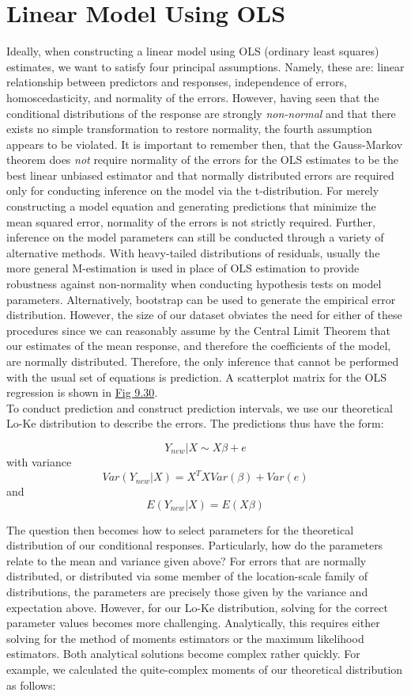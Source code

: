 \documentclass[12pt, a4paper, openany]{book}
\newcommand\tab[1][1cm]{\hspace*{#1}}
\begin{document}
	\section{Linear Model Using OLS}
	\tab Ideally, when constructing a linear model using OLS (ordinary least squares) estimates, we want to satisfy four principal assumptions. Namely, these are: linear relationship between predictors and responses, independence of errors, homoscedasticity, and normality of the errors. However, having seen that the conditional distributions of the response are strongly \textit{non-normal} and that there exists no simple transformation to restore normality, the fourth assumption appears to be violated. It is important to remember then, that the Gauss-Markov theorem does \textit{not} require normality of the errors for the OLS estimates to be the best linear unbiased estimator and that normally distributed errors are required only for conducting inference on the model via the t-distribution. For merely constructing a model equation and generating predictions that minimize the mean squared error, normality of the errors is not strictly required. Further, inference on the model parameters can still be conducted through a variety of alternative methods. With heavy-tailed distributions of residuals, usually the more general M-estimation is used in place of OLS estimation to provide robustness against non-normality when conducting hypothesis tests on model parameters. Alternatively, bootstrap can be used to generate the empirical error distribution. However, the size of our dataset obviates the need for either of these procedures since we can reasonably assume by the Central Limit Theorem that our estimates of the mean response, and therefore the coefficients of the model, are normally distributed. Therefore, the only inference that cannot be performed with the usual set of equations is prediction. A scatterplot matrix for the OLS regression is shown in \underline{Fig 9.30}.\\
	\tab To conduct prediction and construct prediction intervals, we use our theoretical Lo-Ke distribution to describe the errors. The predictions thus have the form: \begin{center}
	$$Y_{new}|X\sim X\beta + e$$
	with variance
	$$Var(Y_{new}|X) = X^TXVar(\beta) + Var(e)$$
	and
	$$E(Y_{new}|X) = E(X\beta)$$
	\end{center} 
	\tab The question then becomes how to select parameters for the theoretical distribution of our conditional responses. Particularly, how do the parameters relate to the mean and variance given above?  For errors that are normally distributed, or distributed via some member of the location-scale family of distributions, the parameters are precisely those given by the variance and expectation above. However, for our Lo-Ke distribution, solving for the correct parameter values becomes more challenging. Analytically, this requires either solving for the method of moments estimators or the maximum likelihood estimators. Both analytical solutions become complex rather quickly. For example, we calculated the quite-complex moments of our theoretical distribution as follows:
\end{document}
